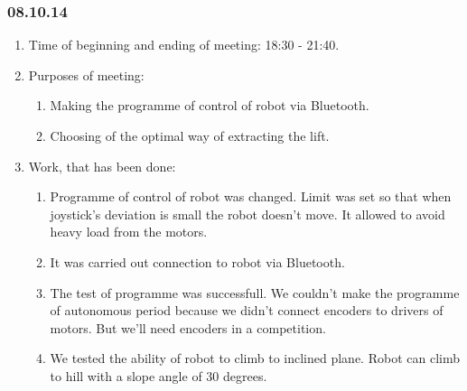 
\subsubsection{08.10.14}

\begin{enumerate}
	\item Time of beginning and ending of meeting: 18:30 - 21:40.
	\item Purposes of meeting:
	\begin{enumerate}
	  \item Making the programme of control of robot via Bluetooth.
	  
	  \item Choosing of the optimal way of extracting the lift.
	  
    \end{enumerate}
	\item Work, that has been done:
	\begin{enumerate}
	  \item Programme of control of robot was changed. Limit was set so that when joystick's deviation is small the robot doesn't move. It allowed to avoid heavy load from the motors.
      
      \item It was carried out connection to robot via Bluetooth.
      
      \item The test of programme was successfull. We couldn't make the programme of autonomous period because we didn't connect encoders to drivers of motors. But we'll need encoders in a competition.
      
      \item We tested the ability of robot to climb to inclined plane. Robot can climb to hill with a slope angle of 30 degrees.
       

\end{enumerate}
\end{enumerate}
